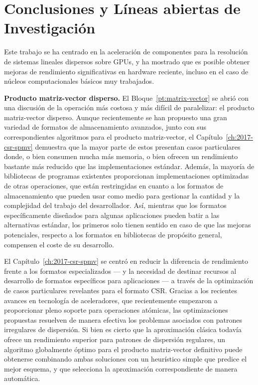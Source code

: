 \section{Conclusiones y Líneas abiertas de Investigación}

Este trabajo se ha centrado en la aceleración de componentes para la resolución
de sistemas lineales dispersos sobre GPUs, y ha mostrado que es posible obtener
mejoras de rendimiento significativas en hardware reciente, incluso en el caso
de núcleos computacionales básicos muy trabajados.

\noindent \textbf{Producto matriz-vector disperso.}
El Bloque~\ref{pt:matrix-vector} se abrió con una discusión de la operación más
costosa y más difícil de paralelizar: el producto matriz-vector disperso. Aunque
recientemente se han propuesto una gran variedad de formatos de almacenamiento
avanzados, junto con sus correspondientes algoritmos para el producto
matriz-vector, el Capítulo~\ref{ch:2017-csr-spmv} demuestra que la mayor parte
de estos presentan casos particulares donde, o bien consumen mucha más memoria,
o bien ofrecen un rendimiento bastante más reducido que las implementaciones
estándar. Además, la mayoría de bibliotecas de programas existentes proporcionan
implementaciones optimizadas de otras operaciones, que están restringidas en
cuanto a los formatos de almacenamiento que pueden usar como medio para
gestionar la cantidad y la complejidad del trabajo del desarrollador.  Así,
mientras que los formatos específicamente diseñados para algunas aplicaciones
pueden batir a las alternativas estándar, los primeros solo tienen sentido en
caso de que las mejoras potenciales, respecto a los formatos en bibliotecas de
propósito general, compensen el coste de su desarrollo.

El Capítulo~\ref{ch:2017-csr-spmv} se centró en reducir la diferencia de
rendimiento frente a los formatos especializados --- y la necesidad de destinar
recursos al desarrollo de formatos específicos para aplicaciones --- a través de
la optimización de casos particulares revelantes para el formato CSR.  Gracias a
los recientes avances en tecnología de aceleradores, que recientemente empezaron
a proporcionar pleno soporte para operaciones atómicas, las optimizaciones
propuestas resuelven de manera efectiva los problemas asociados con patrones
irregulares de dispersión.  Si bien es cierto que la aproximación clásica
todavía ofrece un rendimiento superior para patrones de dispersión regulares, un
algoritmo globalmente óptimo para el producto matriz-vector definitivo puede
obtenerse combinando ambas soluciones con un heurístico simple que predice el
mejor esquema, y que selecciona la aproximación correspondiente de manera
automática.

